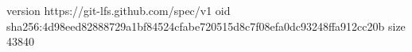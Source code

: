 version https://git-lfs.github.com/spec/v1
oid sha256:4d98eed82888729a1bf84524cfabe720515d8c7f08efa0dc93248ffa912cc20b
size 43840

